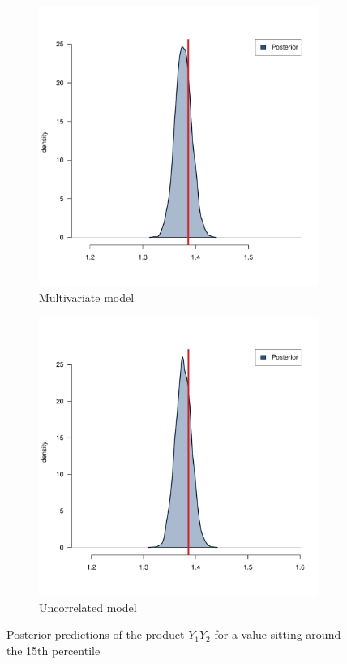 \begin{figure}[htb]
	\centering
	\begin{subfigure}{0.4\textwidth}
		\includegraphics{./Figures/alpha_corr.pdf}
		\caption{Multivariate model}
	\end{subfigure}
	\hfil
	\begin{subfigure}{0.4\textwidth}
		\includegraphics{./Figures/alpha_uncorr.pdf}
		\caption{Uncorrelated model}
	\end{subfigure}
	\caption{Posterior predictions of the product \( Y_1 Y_2 \) for a value sitting around the 15\textup{th} percentile}
	\label{fig::res-params}
\end{figure}



